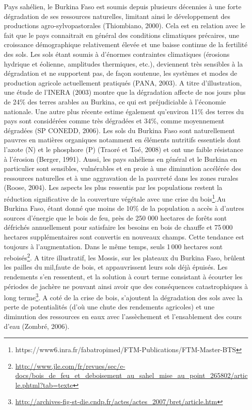 \documentclass[a4paper,11pt]{article}
\begin{document}
Pays sahélien, le Burkina Faso est soumis depuis plusieurs décennies à
une forte dégradation de ses ressources naturelles, limitant ainsi le
développement des productions agro-sylvopastorales (Thiombiano,
2000). Cela est en relation avec le fait que le pays connaitrait en
général des conditions climatiques précaires, une croissance
démographique relativement élevée et une baisse continue de la
fertilité des sols. Les sols étant soumis à d’énormes contraintes
climatiques (érosions hydrique et éolienne, amplitudes thermiques,
etc.), deviennent très sensibles à la dégradation et ne supportent
pas, de façon soutenue, les systèmes et modes de production agricole
actuellement pratiqués (PANA, 2003). A titre d’illustration, une étude
de l’INERA (2003) montre que la dégradation affecte de nos jours plus
de 24\% des terres arables au Burkina, ce qui est préjudiciable à
l’économie nationale. Une autre plus récente estime également
qu’environ 11\% des terres du pays sont considérées comme très
dégradées et 34\%, comme moyennement dégradées (SP CONEDD, 2006).  Les
sols du Burkina Faso sont naturellement pauvres en matières organiques
notamment en éléments nutritifs essentiels dont l’azote (N) et le
phosphore (P) (Traoré et Toé, 2008) et ont une faible résistance à
l’érosion (Berger, 1991). Aussi, les pays sahéliens en général et le
Burkina en particulier sont sensibles, vulnérables et en proie à une
diminution accélérée des ressources naturelles et à une aggravation de
la pauvreté dans les zones rurales (Roose, 2004). Les aspects les plus
ressentis par les populations restent la réduction significative de la
couverture végétale avec une crise du
bois\footnote{https://www6.inra.fr/fabatropimed/FTM-Publications/FTM-Master-BTS}.Au
Burkina Faso, étant donné que moins de 10\% de la population a accès à
d’autres sources d’énergie que le bois de feu, près de 250 000
hectares de forêts sont défrichés annuellement pour satisfaire les
besoins en bois de chauffe et 75\,000 hectares supplémentaires sont
convertis en nouveaux champs. Cette tendance est toujours à
l’augmentation. Dans le même temps, seuls 1\,000 hectares sont
reboisés\footnote{\url{http://www.jle.com/fr/revues/sec/e-docs/bois_de_feu_et_deboisement_au_sahel_mise_au_point_265802/article.phtml?tab=texte}}. A
titre illustratif, les Mossis, sur les plateaux du Burkina Faso,
brûlent les pailles du mil,faute de bois, et appauvrissent leurs sols
déjà épuisés. Les rendements s’en ressentent, et la solution à court
terme consistant à écourter les périodes de jachère ne pouvant ainsi
avoir que des conséquences catastrophiques à long
terme\footnote{\url{http://archives-fig-st-die.cndp.fr/actes/actes_2007/bret/article.htm}}. A
coté de la crise de bois, s’ajoutent la dégradation des sols avec la
perte de potentialités (d’où une chute des rendements agricoles) et
une diminution des ressources en eaux avec l’assèchement et
l’ensablement des cours d’eau (Zombré, 2006)\cite{Doggett_1988}.
\end{document}
